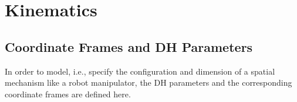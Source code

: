 \chapter{Kinematics}
\section{Coordinate Frames and DH Parameters}
\label{app:DH}
In order to model, i.e., specify the configuration and dimension of a spatial mechanism like a robot manipulator, the DH parameters and the corresponding coordinate frames are defined here. 

